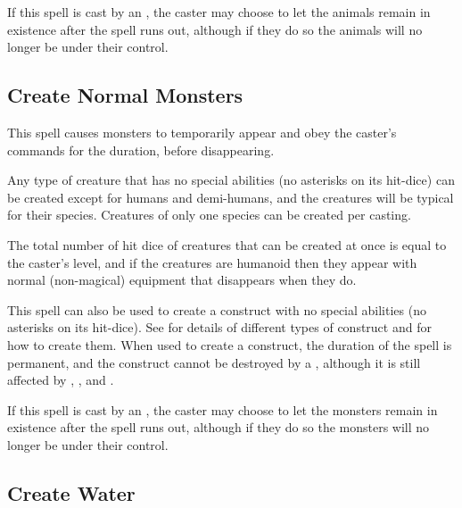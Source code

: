 \begin{multicols*}{2}
If this spell is cast by an , the caster may choose to let the animals remain in existence after the spell runs out, although if they do so the animals will no longer be under their control.

\subsection{Create Normal Monsters}\label{spell:Create Normal Monsters}

This spell causes monsters to temporarily appear and obey the caster’s commands for the duration, before disappearing.

Any type of creature that has no special abilities (no asterisks on its hit-dice) can be created except for humans and demi-humans, and the creatures will be typical for their species. Creatures of only one species can be created per casting.

The total number of hit dice of creatures that can be created at once is equal to the caster’s level, and if the creatures are humanoid then they appear with normal (non-magical) equipment that disappears when they do.

This spell can also be used to create a construct with no special abilities (no asterisks on its hit-dice). See  for details of different types of construct and  for how to create them. When used to create a construct, the duration of the spell is permanent, and the construct cannot be destroyed by a , although it is still affected by , , and .

If this spell is cast by an , the caster may choose to let the monsters remain in existence after the spell runs out, although if they do so the monsters will no longer be under their control.

\subsection{Create Water}\label{spell:Create Water}
\end{multicols*}
